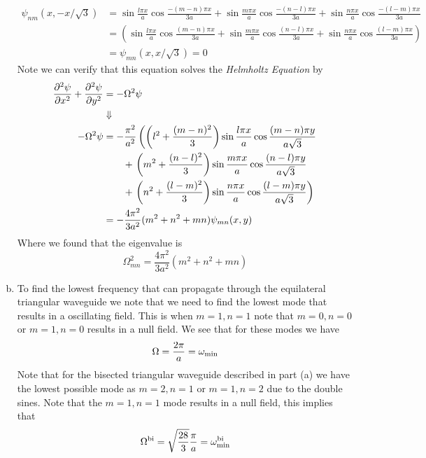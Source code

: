 \documentclass[11pt]{article}
\numberwithin{equation}{section}
\begin{document}
\begin{enumerate}[(a)]
    \begin{align*}
        \psi_{nm}(x,-x/\sqrt{3}) &= \sin\frac{l\pi{x}}{a}\cos\frac{-(m-n)\pi{x}}{3a}
            + \sin\frac{m\pi{x}}{a}\cos\frac{-(n-l)\pi{x}}{3a}
            + \sin\frac{n\pi{x}}{a}\cos\frac{-(l-m)\pi{x}}{3a}\\
        &= \left(\sin\frac{l\pi{x}}{a}\cos\frac{(m-n)\pi{x}}{3a}
            + \sin\frac{m\pi{x}}{a}\cos\frac{(n-l)\pi{x}}{3a}
            + \sin\frac{n\pi{x}}{a}\cos\frac{(l-m)\pi{x}}{3a}\right)\\
        &= \psi_{mn}(x,x/\sqrt{3}) = 0
    \end{align*}
    Note we can verify that this equation solves the \emph{Helmholtz Equation} by
    \begin{align*}
        \frac{\partial{^2\psi}}{\partial{x^2}} + \frac{\partial{^2\psi}}{\partial{y^2}} &= -\Omega^2\psi \\
                                                        &\Downarrow\\
        -\Omega^2\psi &= -\frac{\pi^2}{a^2}\left(\left(l^2+\frac{(m-n)^2}{3}\right)\sin\frac{l\pi{x}}{a}\cos\frac{(m-n)\pi{y}}{a\sqrt{3}}\right.\\
                      &\qquad+\left.\left(m^2+\frac{(n-l)^2}{3}\right)\sin\frac{m\pi{x}}{a}\cos\frac{(n-l)\pi{y}}{a\sqrt{3}}\right.\\
                      &\qquad+\left.\left(n^2+\frac{(l-m)^2}{3}\right)\sin\frac{n\pi{x}}{a}\cos\frac{(l-m)\pi{y}}{a\sqrt{3}}\right)\\
                      &= -\frac{4\pi^2}{3a^2}(m^2+n^2+mn)\psi_{mn}(x,y)
    \end{align*}
    Where we found that the eigenvalue is 
    $$\Omega^2_{mn} = \frac{4\pi^2}{3a^2}(m^2+n^2+mn)$$

\item
    To find the lowest frequency that can propagate through the equilateral triangular waveguide we note that we need
    to find the lowest mode that results in a oscillating field. This is when $m=1,n=1$ note that $m=0,n=0$ or $m=1,n=0$
    results in a null field.  We see that for these modes we have 
    $$\Omega = \frac{2\pi}{a} = \omega_{\textnormal{min}}$$
    Note that for the bisected triangular waveguide described in part (a) we have the lowest possible mode as 
    $m=2,n=1$ or $m=1,n=2$ due to the double sines. Note that the $m=1,n=1$ mode results in a null field,
    this implies that 
    $$\Omega^{\textnormal{bi}} = \sqrt{\frac{28}{3}}\frac{\pi}{a} = \omega^{\textnormal{bi}}_{\textnormal{min}}$$
\end{enumerate}
\end{document}
